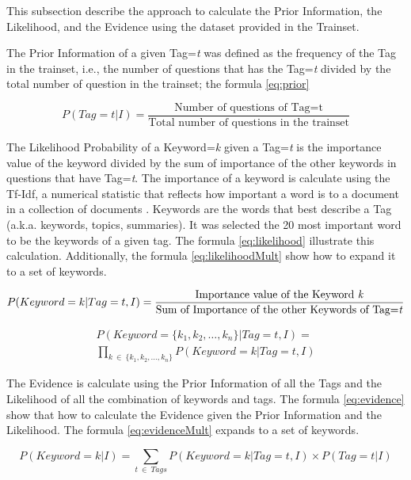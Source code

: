 This subsection describe the approach to calculate the Prior Information, the Likelihood, and the Evidence using the dataset provided in the Trainset.

The Prior Information of a given Tag=\emph{t} was defined as the frequency of the Tag in the trainset, i.e., the number of questions that has the Tag=\emph{t} divided by the total number of question in the trainset; the formula \ref{eq:prior}

\begin{equation} \label{eq:prior}
    P(Tag = t | I) = \frac{\text{Number of questions of Tag=t}}{\text{Total number of questions in the trainset}}
\end{equation}

The Likelihood Probability of a Keyword=\emph{k} given a Tag=\emph{t} is the importance value of the keyword divided by the sum of importance of the other keywords in questions that have Tag=\emph{t}.
The importance of a keyword is calculate using the Tf-Idf, a numerical statistic that reflects how important a word is to a document in a collection of documents \citep{aizawa2003information}.
Keywords are the words that best describe a Tag (a.k.a. keywords, topics, summaries).
It was selected the 20 most important word to be the keywords of a given tag.
The formula \ref{eq:likelihood} illustrate this calculation.
Additionally, the formula \ref{eq:likelihoodMult} show how to expand it to a set of keywords.

\begin{equation} \label{eq:likelihood}
    P(Keyword=k | Tag=t, I) = \frac{\text{Importance value of the Keyword \emph{k}}}{\text{Sum of Importance of the other Keywords of Tag=\emph{t}}}
\end{equation}

\begin{multline} \label{eq:likelihoodMult}
    P(Keyword=\{k_{1},k_{2}, \dots , k_{n}\} | Tag=t, I) = \\
    \prod_{k \: \in \: \{k_{1},k_{2}, \dots , k_{n}\}} P(Keyword=k | Tag=t,I)
\end{multline}

The Evidence is calculate using the Prior Information of all the Tags and the Likelihood of all the combination of keywords and tags.
The formula \ref{eq:evidence} show that how to calculate the Evidence given the Prior Information and the Likelihood.
The formula \ref{eq:evidenceMult} expands to a set of keywords.

\begin{equation} \label{eq:evidence}
    P(Keyword=k | I) = \sum_{t \: \in \: Tags} P(Keyword=k | Tag=t, I) \times P(Tag=t | I)
\end{equation}

